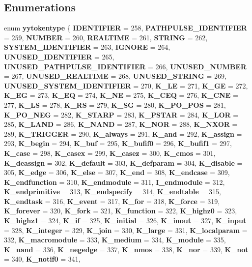 \subsection*{Enumerations}
\begin{CompactItemize}
\item 
enum {\bf yytokentype} \{ {\bf IDENTIFIER} =  258, 
{\bf PATHPULSE\_\-IDENTIFIER} =  259, 
{\bf NUMBER} =  260, 
{\bf REALTIME} =  261, 
{\bf STRING} =  262, 
{\bf SYSTEM\_\-IDENTIFIER} =  263, 
{\bf IGNORE} =  264, 
{\bf UNUSED\_\-IDENTIFIER} =  265, 
{\bf UNUSED\_\-PATHPULSE\_\-IDENTIFIER} =  266, 
{\bf UNUSED\_\-NUMBER} =  267, 
{\bf UNUSED\_\-REALTIME} =  268, 
{\bf UNUSED\_\-STRING} =  269, 
{\bf UNUSED\_\-SYSTEM\_\-IDENTIFIER} =  270, 
{\bf K\_\-LE} =  271, 
{\bf K\_\-GE} =  272, 
{\bf K\_\-EG} =  273, 
{\bf K\_\-EQ} =  274, 
{\bf K\_\-NE} =  275, 
{\bf K\_\-CEQ} =  276, 
{\bf K\_\-CNE} =  277, 
{\bf K\_\-LS} =  278, 
{\bf K\_\-RS} =  279, 
{\bf K\_\-SG} =  280, 
{\bf K\_\-PO\_\-POS} =  281, 
{\bf K\_\-PO\_\-NEG} =  282, 
{\bf K\_\-STARP} =  283, 
{\bf K\_\-PSTAR} =  284, 
{\bf K\_\-LOR} =  285, 
{\bf K\_\-LAND} =  286, 
{\bf K\_\-NAND} =  287, 
{\bf K\_\-NOR} =  288, 
{\bf K\_\-NXOR} =  289, 
{\bf K\_\-TRIGGER} =  290, 
{\bf K\_\-always} =  291, 
{\bf K\_\-and} =  292, 
{\bf K\_\-assign} =  293, 
{\bf K\_\-begin} =  294, 
{\bf K\_\-buf} =  295, 
{\bf K\_\-bufif0} =  296, 
{\bf K\_\-bufif1} =  297, 
{\bf K\_\-case} =  298, 
{\bf K\_\-casex} =  299, 
{\bf K\_\-casez} =  300, 
{\bf K\_\-cmos} =  301, 
{\bf K\_\-deassign} =  302, 
{\bf K\_\-default} =  303, 
{\bf K\_\-defparam} =  304, 
{\bf K\_\-disable} =  305, 
{\bf K\_\-edge} =  306, 
{\bf K\_\-else} =  307, 
{\bf K\_\-end} =  308, 
{\bf K\_\-endcase} =  309, 
{\bf K\_\-endfunction} =  310, 
{\bf K\_\-endmodule} =  311, 
{\bf I\_\-endmodule} =  312, 
{\bf K\_\-endprimitive} =  313, 
{\bf K\_\-endspecify} =  314, 
{\bf K\_\-endtable} =  315, 
{\bf K\_\-endtask} =  316, 
{\bf K\_\-event} =  317, 
{\bf K\_\-for} =  318, 
{\bf K\_\-force} =  319, 
{\bf K\_\-forever} =  320, 
{\bf K\_\-fork} =  321, 
{\bf K\_\-function} =  322, 
{\bf K\_\-highz0} =  323, 
{\bf K\_\-highz1} =  324, 
{\bf K\_\-if} =  325, 
{\bf K\_\-initial} =  326, 
{\bf K\_\-inout} =  327, 
{\bf K\_\-input} =  328, 
{\bf K\_\-integer} =  329, 
{\bf K\_\-join} =  330, 
{\bf K\_\-large} =  331, 
{\bf K\_\-localparam} =  332, 
{\bf K\_\-macromodule} =  333, 
{\bf K\_\-medium} =  334, 
{\bf K\_\-module} =  335, 
{\bf K\_\-nand} =  336, 
{\bf K\_\-negedge} =  337, 
{\bf K\_\-nmos} =  338, 
{\bf K\_\-nor} =  339, 
{\bf K\_\-not} =  340, 
{\bf K\_\-notif0} =  341, 

\end{CompactItemize}
